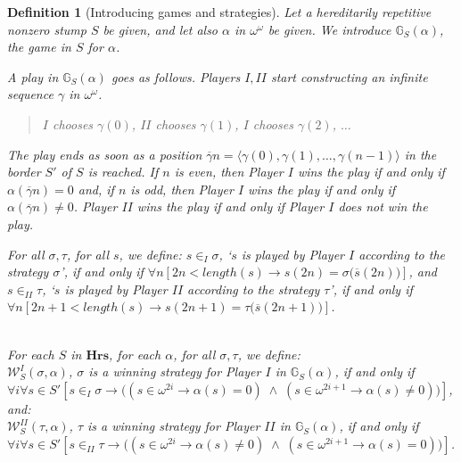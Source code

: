 \documentclass[a4paper]{amsart}
\theoremstyle{plain}
\newtheorem{definition}{Definition}
\begin{document}
\begin{definition}[Introducing games and strategies] Let a hereditarily repetitive nonzero stump $S$ be given, and let also $\alpha$ in $\omega^\omega$ be given. We introduce $\mathbb{G}_S(\alpha)$, \emph{the game in $S$ for $\alpha$}. 
 
 A play in $\mathbb{G}_S(\alpha)$ goes as follows.  Players $I,II$ start constructing an infinite sequence $\gamma$ in $\omega^\omega$.\begin{quote} $I$ chooses  $\gamma(0)$, $II$ chooses $\gamma(1)$, $I$ chooses $\gamma(2)$, $\ldots$ \end{quote}
 The play ends as soon as a position $\overline \gamma n= \langle \gamma(0), \gamma(1), \ldots, \gamma(n-1)\rangle$ in the \emph{border} $S'$ of $S$ is reached. If $n$ is even, then Player $I$ wins the play if and only if $\alpha(\overline \gamma n)=0$ and, if $n$ is odd, then Player $I$ wins the play if and only if $\alpha(\overline \gamma n)\neq 0$. Player $II$ wins the play if and only if Player $I$ does not win the play.
 
 \smallskip For all $\sigma, \tau$, for all $s$, we define: $s\in_I\sigma$, \emph{`$s$ is played by Player $I$ according to the strategy $\sigma$'}, if and only if $\forall n[2n<length(s)\rightarrow s(2n)=\sigma\bigl(\overline s(2n)\bigr)]$, and
 $s\in_{II}\tau$, \emph{`$s$ is played by Player $II$ according to the strategy $\tau$'}, if and only if $\forall n[2n+1<length(s)\rightarrow s(2n+1)=\tau\bigl(\overline s(2n+1)\bigr)]$.
 
 
  
 
  $\;$\\For each  $S$ in $\mathbf{Hrs}$, for each $\alpha$, for all $\sigma,\tau$, we define:\\ $\mathcal{W}^I_S(\sigma, \alpha)$, \emph{$\sigma$ is a winning strategy for Player $I$ in $\mathbb{G}_S(\alpha)$},  if and only if \\$\forall i\forall s\in S'[s\in_I\sigma\rightarrow\bigl( (s\in \omega^{2i} \rightarrow \alpha(s)= 0)\;\wedge\; (s\in \omega^{2i+1} \rightarrow \alpha(s)\neq 0)\bigr)]$, and:\\ $\mathcal{W}^{II}_S(\tau, \alpha)$, \emph{$\tau$ is a winning strategy for Player $II$ in $\mathbb{G}_S(\alpha)$},  if and only if  \\$\forall i\forall s\in S'[s\in_{II}\tau\rightarrow\bigl( (s\in \omega^{2i} \rightarrow \alpha(s)\neq 0)\;\wedge\; (s\in \omega^{2i+1} \rightarrow \alpha(s)= 0)\bigr)]$. \end{definition}
 
\end{document}

